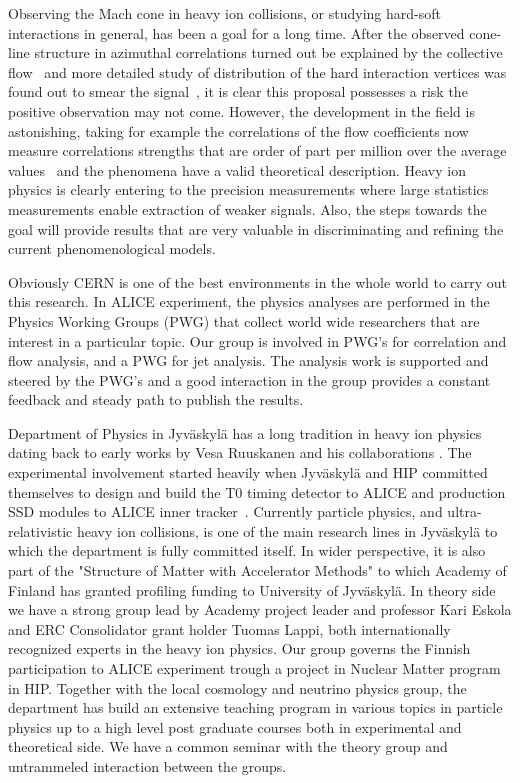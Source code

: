 Observing the Mach cone in heavy ion collisions, or studying hard-soft interactions in general, has been a goal for a long time. After the observed cone-line structure in azimuthal correlations turned out be explained by the collective flow~\cite{ALICE:2011ab} and more detailed study of distribution of the hard interaction vertices was found out to smear the signal~\cite{Tachibana:2015qxa}, it is clear this proposal possesses a risk the positive observation may not come. However, the development in the field is astonishing, taking for example the correlations of the flow coefficients now measure correlations strengths that are order of part per million over the average values~\cite{ALICE:2016kpq} and the phenomena have a valid theoretical description. Heavy ion physics is clearly entering to the precision measurements where large statistics measurements enable extraction of weaker signals. Also, the steps towards the goal will provide results that are very valuable in discriminating and refining the current phenomenological models.

Obviously CERN is one of the best environments in the whole world to carry out this research. In ALICE experiment, the physics analyses are performed in the Physics Working Groups (PWG) that collect world wide researchers that are interest in a particular topic. Our group is involved in PWG's for correlation and flow analysis, and a PWG for jet analysis. The analysis work is supported and steered by the PWG's and a good interaction in the group provides a constant feedback and steady path to publish the results.

Department of Physics in Jyv\"askyl\"a has a long tradition in heavy ion physics dating back to early works by Vesa Ruuskanen and his collaborations \cite{VonGersdorff:1986tqh}. The experimental involvement started heavily when Jyv\"askyl\"a and HIP committed themselves to design and build the T0 timing detector to ALICE and production SSD modules to ALICE inner tracker~\cite{Dellacasa:1999kf}. Currently particle physics, and ultra-relativistic heavy ion collisions, is one of the main research lines in Jyv\"askyl\"a to which the department is fully committed itself. In wider perspective, it is also part of the "Structure of Matter with Accelerator Methods" to which Academy of Finland has granted profiling funding to University of Jyv\"askyl\"a. In theory side we have a strong group lead by Academy project leader and professor Kari Eskola and ERC Consolidator grant holder Tuomas Lappi, both internationally recognized experts in the heavy ion physics. Our group governs the Finnish participation to ALICE experiment trough a project in Nuclear Matter program in HIP. Together with the local cosmology and neutrino physics group, the department has build an extensive teaching program in various topics in particle physics up to a high level post graduate courses both in experimental and theoretical side. We have a common seminar with the theory group and untrammeled interaction between the groups.

